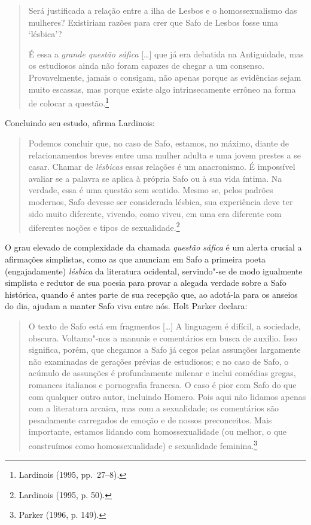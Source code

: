 \begin{quote}
Será justificada a relação entre a ilha de Lesbos e o homossexualismo das
mulheres? Existiriam razões para crer que Safo de Lesbos fosse uma ‘lésbica’?

É essa a \textit{grande questão sáfica} [\ldots{}] que já era debatida na Antiguidade, mas
os estudiosos ainda não foram capazes de chegar a um consenso. Provavelmente,
jamais o consigam, não apenas porque as evidências sejam muito escassas, mas
porque existe algo intrinsecamente errôneo na forma de colocar a questão.\footnote{ Lardinois (1995, pp.~27--8).}
\end{quote}

Concluindo seu estudo, afirma Lardinois:

\begin{quote}
Podemos concluir que, no caso de Safo, estamos, no máximo, diante de
relacionamentos breves entre uma mulher adulta e uma jovem prestes a se casar.
Chamar de \textit{lésbicas} essas relações é um anacronismo. É impossível avaliar se a
palavra se aplica à própria Safo ou à sua vida íntima. Na verdade, essa é uma
questão sem sentido. Mesmo se, pelos padrões modernos, Safo devesse ser
considerada lésbica, sua experiência deve ter sido muito diferente, vivendo,
como viveu, em uma era diferente com diferentes noções e tipos de sexualidade.\footnote{ Lardinois (1995, p. 50).}
\end{quote}

O grau elevado de complexidade da chamada \textit{questão sáfica} é um alerta
crucial a afirmações simplistas, como as que anunciam em Safo a
primeira poeta (engajadamente) \textit{lésbica} da literatura ocidental,
servindo"-se de modo igualmente simplista e redutor de sua poesia para provar a alegada
verdade sobre a Safo histórica, quando é antes parte de sua recepção que, ao adotá-la 
para os anseios do dia, ajudam a manter Safo viva entre nós. Holt Parker declara: 

\begin{quote}
O texto de Safo está em fragmentos [\ldots{}] A linguagem é difícil, a sociedade,
obscura. Voltamo"-nos a manuais e comentários em busca de auxílio. Isso
significa, porém, que chegamos a Safo já cegos pelas assunções largamente não
examinadas de gerações prévias de estudiosos; e no caso de Safo, o acúmulo de
assunções é profundamente milenar e inclui comédias gregas, romances italianos
e pornografia francesa. O caso é pior com Safo do que com qualquer outro autor,
incluindo Homero. Pois aqui não lidamos apenas com a literatura arcaica, mas
com a sexualidade; os comentários são pesadamente carregados de emoção e de
nossos preconceitos. Mais importante, estamos lidando com homossexualidade (ou
melhor, o que construímos como homossexualidade) e sexualidade feminina.\footnote{ Parker (1996, p. 149).}
\end{quote}

